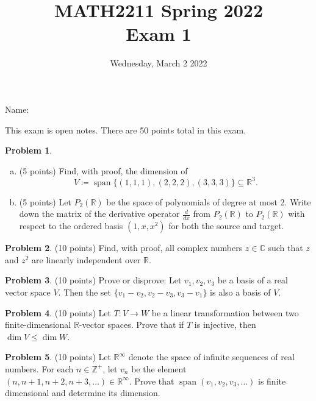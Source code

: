 \documentclass[11pt,oneside]{amsart}
\title{MATH2211 Spring 2022\\
Exam 1}
\author{Wednesday, March 2 2022}
\theoremstyle{definition}
\newtheorem{problem}{Problem}
\newcommand{\bC}{\mathbb{C}}
\newcommand{\bR}{\mathbb{R}}
\newcommand{\bZ}{\mathbb{Z}}
\DeclareMathOperator{\Span}{span}
\begin{document}
    \maketitle

    Name: \underline{\hspace{6cm}}

    This exam is open notes. There are 50 points total in this exam.

    \begin{problem}
        \leavevmode\begin{enumerate}[(a)]
            \item (5 points) Find, with proof, the dimension of
            \[V\coloneqq\Span\{(1,1,1), (2,2,2), (3,3,3)\}\subseteq\bR^3.\]
            \vfill
            \item (5 points) Let $P_2(\bR)$ be the space of polynomials of degree at most 2. Write down the matrix of the derivative operator $\frac {d}{dx}$ from $P_2(\bR)$ to $P_2(\bR)$ with respect to the ordered basis $(1,x,x^2)$ for both the source and target.
            \vfill
        \end{enumerate}
    \end{problem}
    \newpage

    \begin{problem}
        (10 points) Find, with proof, all complex numbers $z\in\bC$ such that $z$ and $z^2$ are linearly independent over $\bR$.
    \end{problem}
    \vfill

    \begin{problem}
        (10 points) Prove or disprove: Let $v_1,v_2,v_3$ be a basis of a real vector space $V$. Then the set $\{v_1-v_2,v_2-v_3,v_3-v_1\}$ is also a basis of $V$.
    \end{problem}
    \vfill
    \newpage

    \begin{problem}
        (10 points) Let $T\colon V\to W$ be a linear transformation between two finite-dimensional $\bR$-vector spaces. Prove that if $T$ is injective, then $\dim V\leq\dim W$.
    \end{problem}
    \newpage

    \begin{problem}
        (10 points) Let $\bR^\infty$ denote the space of infinite sequences of real numbers. For each $n\in\bZ^+$, let $v_n$ be the element $(n,n+1,n+2,n+3,\dots)\in\bR^\infty$. Prove that $\Span(v_1,v_2,v_3,\dots)$ is finite dimensional and determine its dimension.
    \end{problem}
    \vfill
\end{document}
